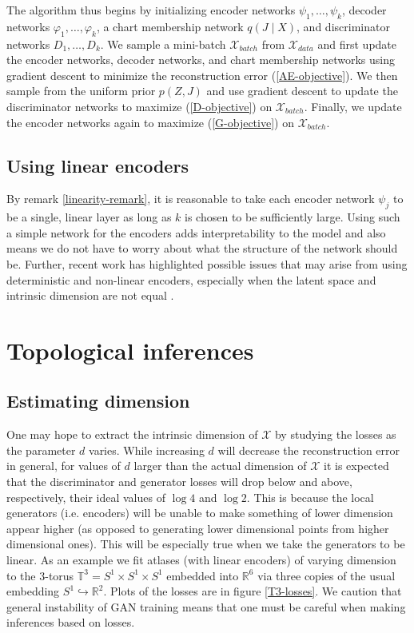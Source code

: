 \documentclass[reqno,11pt]{article}
\renewcommand{\phi}{\varphi}
\newcommand{\X}{\mathcal{X}}
\newcommand{\R}{\mathbb{R}}
\begin{document}
The algorithm thus begins by initializing encoder networks $\psi_1, \ldots, \psi_k$, decoder networks $\phi_1,\ldots, \phi_k$, a chart membership network $q(J\mid X)$, and discriminator networks $D_1, \ldots, D_k$. We sample a mini-batch $\X_{batch}$ from $\X_{data}$ and first update the encoder networks, decoder networks, and chart membership networks using gradient descent to minimize the reconstruction error (\ref{AE-objective}). We then sample from the uniform prior $p(Z,J)$ and use gradient descent to update the discriminator networks to maximize (\ref{D-objective}) on $\X_{batch}$. Finally, we update the encoder networks again to maximize (\ref{G-objective}) on $\X_{batch}$. 

\subsection{Using linear encoders}
By remark \ref{linearity-remark}, it is reasonable to take each encoder network $\psi_j$ to be a single, linear layer as long as $k$ is chosen to be sufficiently large. Using such a simple network for the encoders adds interpretability to the model  and also means we do not have to worry about what the structure of the network should be. Further, recent work has highlighted possible issues that may arise from using deterministic and non-linear encoders, especially when the latent space and intrinsic dimension are not equal \cite{WAE-latent}.
\section{Topological inferences} \label{sec-topology}

\subsection{Estimating dimension}
One may hope to extract the intrinsic dimension of $\X$ by studying the losses as the parameter $d$ varies. While increasing $d$ will decrease the reconstruction error in general, for values of $d$ larger than the actual dimension of $\X$ it is expected that the discriminator and generator losses will drop below and above, respectively, their ideal values of $\log 4$ and $\log 2$. This is because the local generators (i.e. encoders) will be unable to make something of lower dimension appear higher (as opposed to generating lower dimensional points from higher dimensional ones). This will be especially true when we take the generators to be linear. As an example we fit atlases (with linear encoders) of varying dimension to the 3-torus $\mathbb T^3 = S^1\times S^1\times S^1$ embedded into $\R^6$ via three copies of the usual embedding $S^1\hookrightarrow \R^2$. Plots of the losses are in figure \ref{T3-losses}. We caution that general instability of GAN training means that one must be careful when making inferences based on losses. 
\end{document}

